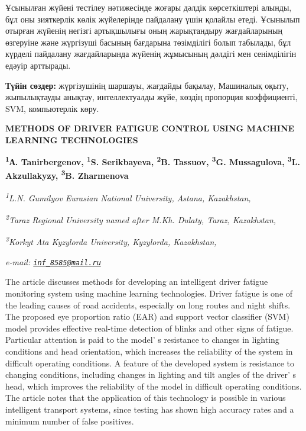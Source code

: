 Ұсынылған жүйені тестілеу нәтижесінде жоғары дәлдік көрсеткіштері
алынды, бұл оны зияткерлік көлік жүйелерінде пайдалану үшін қолайлы
етеді. Ұсынылып отырған жүйенің негізгі артықшылығы оның жарықтандыру
жағдайларының өзгеруіне және жүргізуші басының бағдарына төзімділігі
болып табылады, бұл күрделі пайдалану жағдайларында жүйенің жұмысының
дәлдігі мен сенімділігін едәуір арттырады.

{\bfseries Түйін сөздер:} жүргізушінің шаршауы, жағдайды бақылау, Машиналық
оқыту, жыпылықтауды анықтау, интеллектуалды жүйе, көздің пропорция
коэффициенті, SVM, компьютерлік көру.

\begin{articleheader}
{\bfseries METHODS OF DRIVER FATIGUE CONTROL USING MACHINE LEARNING
TECHNOLOGIES}

{\bfseries
\textsuperscript{1}А. Tanirbergenov,
\textsuperscript{1}S. Serikbayeva\textsuperscript{\envelope },
\textsuperscript{2}B. Tassuov,
\textsuperscript{3}G. Mussagulova,
\textsuperscript{3}L. Akzullakyzy,
\textsuperscript{3}B. Zharmenova}
\end{articleheader}

\begin{affiliation}
\emph{\textsuperscript{1}L.N. Gumilyov Eurasian National University, Astana, Kazakhstan,}

\emph{\textsuperscript{2}Taraz Regional University named after M.Kh. Dulaty, Taraz, Kazakhstan,}

\emph{\textsuperscript{3}Korkyt Ata Kyzylorda University, Kyzylorda,
Kazakhstan,}

\emph{e-mail: \href{mailto:inf_8585@mail.ru}{\nolinkurl{inf\_8585@mail.ru}}}
\end{affiliation}

The article discusses methods for developing an intelligent driver
fatigue monitoring system using machine learning technologies. Driver
fatigue is one of the leading causes of road accidents, especially on
long routes and night shifts. The proposed eye proportion ratio (EAR)
and support vector classifier (SVM) model provides effective real-time
detection of blinks and other signs of fatigue. Particular attention is
paid to the model' s resistance to changes in lighting
conditions and head orientation, which increases the reliability of the
system in difficult operating conditions. A feature of the developed
system is resistance to changing conditions, including changes in
lighting and tilt angles of the driver' s head, which
improves the reliability of the model in difficult operating conditions.
The article notes that the application of this technology is possible in
various intelligent transport systems, since testing has shown high
accuracy rates and a minimum number of false positives.

